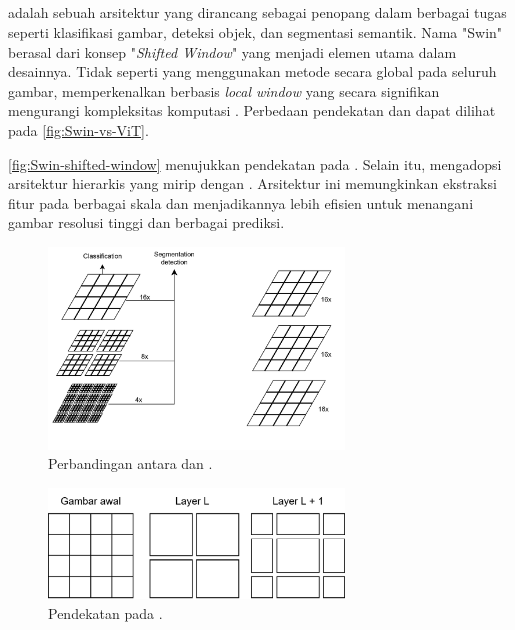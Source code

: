 \subsection{\swin}
\label{subsec:swin}

\swin{} adalah sebuah arsitektur \vitfull{} yang dirancang sebagai penopang dalam berbagai tugas \cv{} seperti klasifikasi gambar, deteksi objek, dan segmentasi semantik. Nama "Swin" berasal dari konsep
"\emph{Shifted Window}" yang menjadi elemen utama dalam desainnya. Tidak seperti \vit{} yang menggunakan metode \selfattention{} secara global
pada seluruh gambar, \swin{} memperkenalkan \selfattention{} berbasis \emph{local window} yang secara signifikan mengurangi kompleksitas komputasi \parencite{liu2021swin}. Perbedaan pendekatan \swin{} dan \vit{} dapat dilihat pada \autoref{fig:Swin-vs-ViT}. 

\autoref{fig:Swin-shifted-window} menujukkan pendekatan \shiftedwindow{} pada \swin. Selain itu, \swin{} mengadopsi arsitektur hierarkis yang mirip dengan \cnn. Arsitektur ini memungkinkan ekstraksi fitur pada berbagai skala dan menjadikannya lebih efisien untuk menangani gambar resolusi tinggi dan berbagai prediksi.

\begin{figure}[htbp]
    \centering
    \includegraphics[width=0.7\textwidth]{images/swin-vit.png}
    \caption{Perbandingan antara \swin{} dan \vitfull{} \parencite{liu2021swin}.}
    \label{fig:Swin-vs-ViT}
\end{figure}

\begin{figure}[htbp]
    \centering
    \includegraphics[width=0.7\textwidth]{images/swin-shifted-window.png}
    \caption{Pendekatan \shiftedwindow{} pada \swin{} \parencite{liu2021swin}.}
    \label{fig:Swin-shifted-window}
\end{figure}


